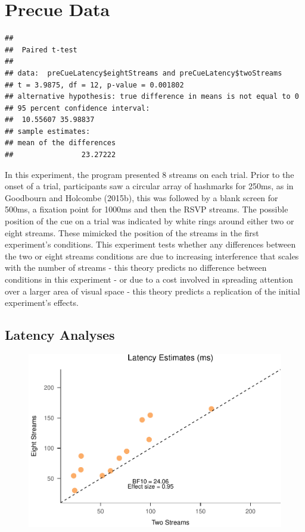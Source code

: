 \documentclass[,man]{apa6}
\theoremstyle{definition}
\theoremstyle{definition}
\theoremstyle{definition}
\theoremstyle{remark}
\begin{document}
\section{Precue Data}\label{precue-data}

\begin{verbatim}
## 
##  Paired t-test
## 
## data:  preCueLatency$eightStreams and preCueLatency$twoStreams
## t = 3.9875, df = 12, p-value = 0.001802
## alternative hypothesis: true difference in means is not equal to 0
## 95 percent confidence interval:
##  10.55607 35.98837
## sample estimates:
## mean of the differences 
##                23.27222
\end{verbatim}

In this experiment, the program presented 8 streams on each trial. Prior
to the onset of a trial, participants saw a circular array of hashmarks
for 250ms, as in Goodbourn and Holcombe (2015b), this was followed by a
blank screen for 500ms, a fixation point for 1000ms and then the RSVP
streams. The possible position of the cue on a trial was indicated by
white rings around either two or eight streams. These mimicked the
position of the streams in the first experiment's conditions. This
experiment tests whether any differences between the two or eight
streams conditions are due to increasing interference that scales with
the number of streams - this theory predicts no difference between
conditions in this experiment - or due to a cost involved in spreading
attention over a larger area of visual space - this theory predicts a
replication of the initial experiment's effects.

\subsection{Latency Analyses}\label{latency-analyses-1}

\begin{figure}
\centering
\includegraphics{nStreams_Bayesian_files/figure-latex/unnamed-chunk-8-1.pdf}
\caption{}
\end{figure}
\end{document}
